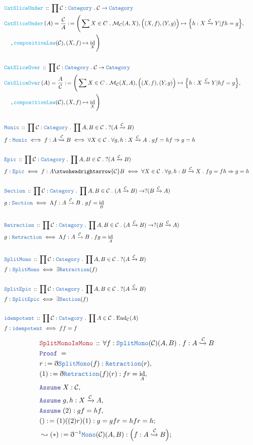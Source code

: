 \documentclass[12pt]{scrartcl}
\newcommand{\TYPE}[1]{\textcolor{NavyBlue}{\mathtt{#1}}}
\newcommand{\FUNC}[1]{\textcolor{Cerulean}{\mathtt{#1}}}
\newcommand{\LOGIC}[1]{\textcolor{Blue}{\mathtt{#1}}}
\newcommand{\THM}[1]{\textcolor{Maroon}{\mathtt{#1}}}
\renewcommand{\.}{\; . \;}
\newcommand{\de}{: \kern 0.1pc =}
\newcommand{\Act}[1]{\left( #1 \right)}
\newcommand{\Theorem}[2]{& \THM{#1} \, :: \, #2 \\ & \Proof = \\ }
\newcommand{\DeclareType}[2]{& \TYPE{#1} \, :: \, #2 \\}
\newcommand{\DefineType}[3]{& #1 : \TYPE{#2} \iff #3 \\}
\newcommand{\DefineNamedType}[4]{& #1 : \TYPE{#2} \iff #3 \iff #4 \\}
\newcommand{\DeclareFunc}[2]{& \FUNC{#1} \, :: \, #2 \\}
\newcommand{\DefineNamedFunc}[4]{&  \FUNC{#1}\Act{#2} = #3 \de #4 \\}
\newcommand{\NewLine}{\\ & \kern 1pc}
\newcommand{\Page}[1]{ \begin{align*} #1 \end{align*}   }
\newcommand{ \bd }{ \ByDef }
\DeclareMathOperator*{\id}{id}
\newcommand{\Cat}{\TYPE{Category}}
\newcommand{\Mor}{\mathcal{M}}
\newcommand{\Endo}{\mathrm{End}}
\newcommand{\ToMono}{\xhookrightarrow}
\newcommand{\ToEpi}{\xtwoheadrightarrow}
\newcommand{\Arrow}{\xrightarrow}
\newcommand{\Say}[3]{& #1 \de #2 : #3, \\}
\newcommand{\Conclude}[3]{& #1 \de #2 : #3; \\}
\newcommand{\DeriveConclude}[3]{& \leadsto #1 \de #2 : #3 ; \\}
\newcommand{\Assume}[2]{& \LOGIC{Assume} \; #1 : #2, \\}
\newcommand{\ByDef}{\eth}
\newcommand{\Proof}{\LOGIC{Proof} \; }
\newcommand{\C}{\mathcal{C}}
\begin{document}
{}\Page{
	\DeclareFunc{CatSliceUnder}{ \prod \C : \Cat \. \C \to \Cat}
	\DefineNamedFunc{CatSliceUnder}{ A }{\frac{\C}{A}}{ \Bigg( \sum X \in C \. \Mor_\C(A,X), 
		\Big((X,f),(Y,g)\Big) \mapsto \Big\{ h : X \xrightarrow{\C} Y | fh = g  \Big\}, \NewLine , 
		\FUNC{compositionLaw}(\C), (X,f) \mapsto \id_X  \Bigg)  }
	\\
	\DeclareFunc{CatSliceOver}{ \prod \C : \Cat \. \C \to \Cat}
	\DefineNamedFunc{CatSliceOver}{ A }{\frac{A}{\C}}{ \Bigg( \sum X \in C \. \Mor_\C(X,A), 
		\Big((X,f),(Y,g)\Big) \mapsto \Big\{ h : X \xrightarrow{\C} Y | hf = g  \Big\}, \NewLine , 
		\FUNC{compositionLaw}(\C), (X,f) \mapsto \id_X  \Bigg)  }
	\\
	\DeclareType{Monic}{\prod \C : \Cat \. \prod A, B \in \C \. ?(A \xrightarrow{\C} B)}
	\DefineNamedType{f}{Monic}{f : A \xhookrightarrow{\C} B}{\forall X \in \C \. \forall g, h : X \xrightarrow{\C} A \.
		gf = hf \Rightarrow g = h  }
	\\
	\DeclareType{Epic}{\prod \C : \Cat \. \prod A,B \in \C \. ?(A \xrightarrow{\C} B)}
	\DefineNamedType{f}{Epic}{ f : A \ToEpi{\C} B}{\forall X \in \C \. \forall g,h : B \xrightarrow{\C} X \. 
		fg = fh \Rightarrow g = h} 
	\\
	\DeclareType{Section}{\prod \C : \Cat \. \prod A, B \in \C \. (A \xrightarrow{\C} B) \to 
		?(B \Arrow{\C} A) }
	\DefineType{g}{Section}{\Lambda f : A \xrightarrow{\C} B \. gf = \id_B}
	\\
	\DeclareType{Retraction}{ \prod \C : \Cat \. \prod A, B \in \C \. (A \xrightarrow{\C} B) \to 
		?(B \Arrow{\C} A) }
	\DefineType{g}{Retraction}{\Lambda f : A \xrightarrow{\C} B \. fg = \id_A}
	\\
	\DeclareType{SplitMono}{\prod \C : \Cat \. \prod A, B \in \C \. ?(A \xrightarrow{\C} B)}
	\DefineType{f}{SplitMono}{ \exists \TYPE{Retraction}(f)}
	\\
	\DeclareType{SplitEpic}{\prod \C : \Cat \. \prod A,B \in \C \. ?(A \xrightarrow{\C} B)}
	\DefineType{f}{SplitEpic}{\exists \TYPE{Section}(f)}
	\\
	\DeclareType{idempotent}{\prod \C : \Cat \. \prod A \in \C \. \Endo_\C(A) }
	\DefineType{f}{idempotent}{ ff = f}
}\Page{
	\Theorem{SplitMonoIsMono}{\forall f : \TYPE{SplitMono}(\C)(A,B) \. f : A \ToMono{\C} B}
	\Say{r}{\bd \TYPE{SplitMono}(f)}{\TYPE{Retraction}(r)}
	\Say{(1)}{\bd \TYPE{Retraction}(f)(r)}{  fr = \id_A   }
	\Assume{X}{\C}
	\Assume{g,h}{X \Arrow{\C} A}
	\Assume{(2)}{gf = hf}
	\Conclude{()}{(1)((2)r)(1)}{g = gfr = hfr = h}
	\DeriveConclude{(*)}{\bd^{-1} \TYPE{Mono}(\C)(A,B)}{\Big( f : A \ToMono{\C} B  \Big)}
}
\end{document}
